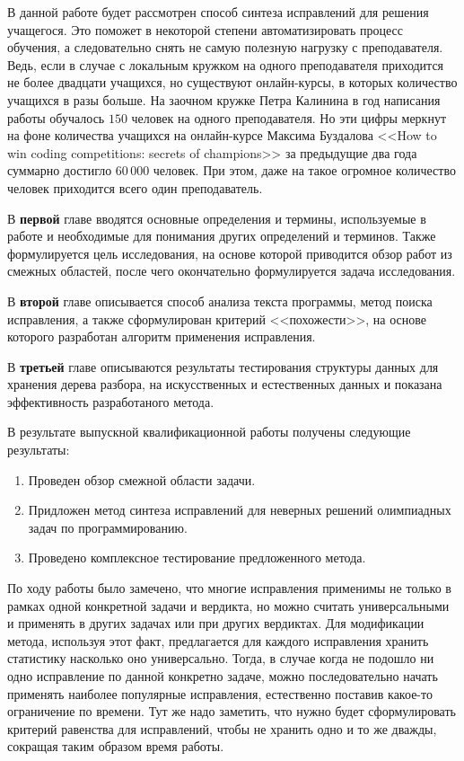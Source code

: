 \documentclass[specification,annotation]{itmo-student-thesis}
\begin{document}
В данной работе будет рассмотрен способ синтеза исправлений для решения учащегося. Это поможет в некоторой
степени автоматизировать процесс обучения, а следовательно снять не самую полезную нагрузку с преподавателя.
Ведь, если в случае с локальным кружком на одного преподавателя приходится не более двадцати учащихся, но существуют
онлайн-курсы, в которых количество учащихся в разы больше. На заочном кружке Петра Калинина в год написания работы
обучалось $150$ человек на одного преподавателя. Но эти цифры меркнут на фоне количества учащихся на онлайн-курсе 
Максима Буздалова <<How to win coding competitions: secrets of champions>> за предыдущие два года суммарно достигло 
$60\,000$ человек. При этом, даже на такое огромное количество человек приходится всего один преподаватель.

В \textbf{первой} главе вводятся основные определения и термины, используемые в работе и необходимые
для понимания других определений и терминов. Также формулируется цель исследования, на основе которой
приводится обзор работ из смежных областей, после чего окончательно формулируется задача исследования.

В \textbf{второй} главе описывается способ анализа текста программы, метод поиска исправления, а также
сформулирован критерий <<похожести>>, на основе которого разработан алгоритм применения исправления.

В \textbf{третьей} главе описываются результаты тестирования структуры данных для хранения дерева разбора,
на искусственных и естественных данных и показана эффективность разработаного метода.






\startconclusionpage

В результате выпускной квалификационной работы получены следующие результаты:
\begin{enumerate}
    \item Проведен обзор смежной области задачи.
    \item Придложен метод синтеза исправлений для неверных решений олимпиадных задач по программированию.
    \item Проведено комплексное тестирование предложенного метода.
\end{enumerate}

По ходу работы было замечено, что многие исправления применимы не только в рамках одной конкретной задачи и вердикта,
но можно считать универсальными и применять в других задачах или при других вердиктах. Для модификации метода, используя
этот факт, предлагается для каждого исправления хранить статистику насколько оно универсально. Тогда, в случае когда
не подошло ни одно исправление по данной конкретно задаче, можно последовательно начать применять наиболее популярные исправления,
естественно поставив какое-то ограничение по времени. Тут же надо заметить, что нужно будет сформулировать критерий равенства
для исправлений, чтобы не хранить одно и то же дважды, сокращая таким образом время работы. 
\end{document}
